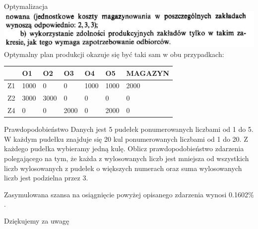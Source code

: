 \documentclass{beamer}
\begin{document}
  \begin{frame}{Optymalizacja}
    \includegraphics[scale=0.5]{images/obrazek2.png}
    Optymalny plan produkcji okazuje się być taki sam w obu przypadkach: 
    \begin{table}[]
      \begin{tabular}{|l|l|l|l|l|l|l|}
      \hline
         & O1   & O2   & O3   & O4   & O5   & MAGAZYN \\ \hline
      Z1 & 1000 & 0    & 0    & 1000 & 1000 & 2000    \\ \hline
      Z2 & 3000 & 3000 & 0    & 0    & 0    & 0       \\ \hline
      Z4 & 0    & 0    & 2000 & 0    & 2000 & 0       \\ \hline
      \end{tabular}
      \end{table}

  \end{frame}
 
  \begin{frame}{Prawdopodobieństwo}
    Danych jest 5 pudełek ponumerowanych liczbami od 1 do 5. W każdym pudełku znajduje się 20 kul ponumerowanych liczbami od 1 do 20.
    Z każdego pudełka wybieramy jedną kulę. Oblicz prawdopodobieństwo zdarzenia polegającego na tym, że każda z wylosowanych liczb jest
    mniejsza od wszystkich liczb wylosowanych z pudełek o większych numerach oraz suma wylosowanych liczb jest podzielna przez 3.  
    
    Zasymulowana szansa na osiągnięcie powyżej opisanego zdarzenia wynosi 0.1602\% . 
  \end{frame}

  \begin{frame}
    \centering \huge Dziękujemy za uwagę 
  \end{frame}
\end{document}
